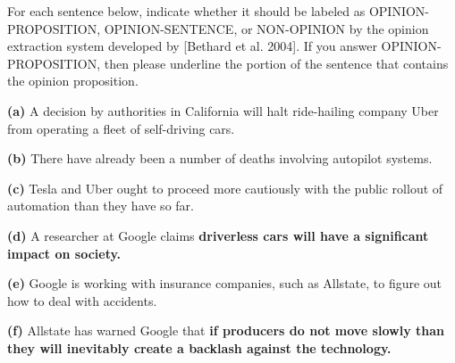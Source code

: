 \documentclass[11pt]{article}
\renewcommand\part[1]{\vspace{.10in}\textbf{(#1)}}
\begin{document}
For each sentence below, indicate whether it should be labeled as OPINION-PROPOSITION, OPINION-SENTENCE, or NON-OPINION by the opinion extraction system developed by [Bethard et al. 2004]. If you answer OPINION-PROPOSITION, then please underline the portion of the sentence that contains the opinion proposition.

\part{a} A decision by authorities in California will halt ride-hailing company Uber from operating a fleet of self-driving cars.


\part{b} There have already been a number of deaths involving autopilot systems.


\part{c} Tesla and Uber ought to proceed more cautiously with the public rollout of automation than they have so far.


\part{d} A researcher at Google claims \textbf{driverless cars will have a significant impact on society.}


\part{e} Google is working with insurance companies, such as Allstate, to figure out how to deal with accidents.


\part{f} Allstate has warned Google that \textbf{if producers do not move slowly than they will inevitably create a backlash against the technology.}
\end{document}
